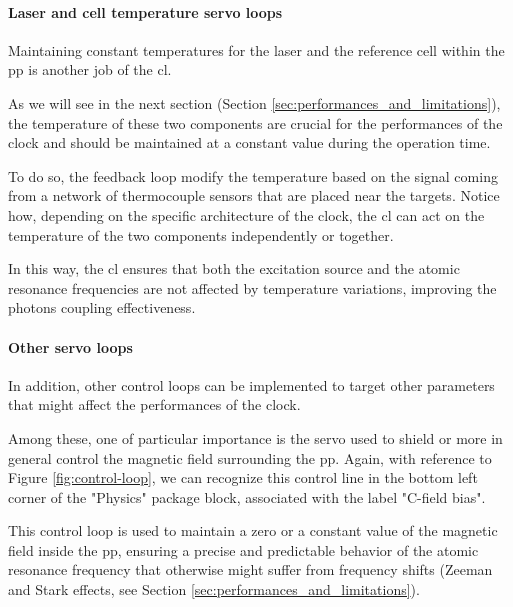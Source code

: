 \paragraph{Laser and cell temperature servo loops}

Maintaining constant temperatures for the laser and the reference cell within the \acrshort{pp} is another job of the \acrshort{cl}.

As we will see in the next section (Section \ref{sec:performances_and_limitations}), the temperature of these two components are crucial for the performances of the clock and should be maintained at a constant value during the operation time.

To do so, the feedback loop modify the temperature based on the signal coming from a network of thermocouple sensors that are placed near the targets.
Notice how, depending on the specific architecture of the clock, the \acrshort{cl} can act on the temperature of the two components independently or together.

In this way, the \acrshort{cl} ensures that both the excitation source and the atomic resonance frequencies are not affected by temperature variations, improving the photons coupling effectiveness.


\paragraph{Other servo loops}

In addition, other control loops can be implemented to target other parameters that might affect the performances of the clock.

Among these, one of particular importance is the servo used to shield or more in general control the magnetic field surrounding the \acrshort{pp}.
Again, with reference to Figure \ref{fig:control-loop}, we can recognize this control line in the bottom left corner of the "Physics" package block, associated with the label "C-field bias".

This control loop is used to maintain a zero or a constant value of the magnetic field inside the \acrshort{pp}, ensuring a precise and predictable behavior of the atomic resonance frequency that otherwise might suffer from frequency shifts (Zeeman and Stark effects, see Section \ref{sec:performances_and_limitations}).
